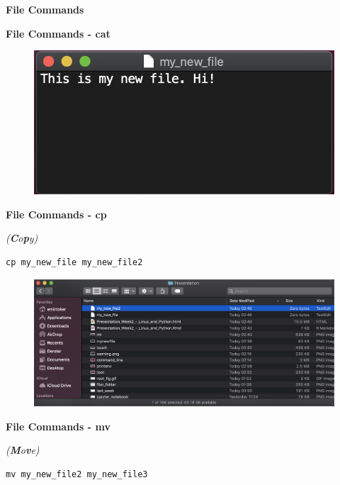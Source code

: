 \documentclass[ignorenonframetext,]{beamer}
\begin{document}
\begin{frame}[fragile]{\textbf{File Commands}}
\begin{block}{\textbf{File Commands - {\textbf{cat}}}}
\begin{figure}
\centering
\includegraphics{mynewfile.png}
\caption{}
\end{figure}

\end{block}

\begin{block}{\textbf{File Commands - {\textbf{cp}}}}

\emph{(\textbf{C}o\textbf{p}y)}

\begin{verbatim}
cp my_new_file my_new_file2
\end{verbatim}

\begin{figure}
\centering
\includegraphics{cp.png}
\caption{}
\end{figure}

\end{block}

\begin{block}{\textbf{File Commands - {\textbf{mv}}}}

\emph{(\textbf{M}o\textbf{v}e)}

\begin{verbatim}
mv my_new_file2 my_new_file3
\end{verbatim}


\end{block}
\end{frame}
\end{document}
